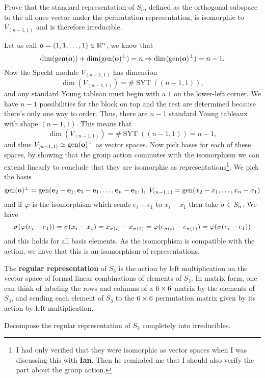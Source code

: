 \documentclass[12pt]{memoir}
\DeclareMathOperator{\SYT}{SYT}
\begin{document}
\begin{Ej}[Exercise 4]
    Prove that the standard representation of $S_n$, defined as the orthogonal subspace to the all
ones vector under the permutation representation, is isomorphic to $V_{(n-1,1)}$ and is therefore irreducible.
\end{Ej}

\begin{ptcbr}
    Let us call $\mathbf{o}=(1,1,\dots,1)\in\mathbb{R}^n$, we know that 
    $$\dim(\operatorname{gen}(\mathbf{o}))+\dim(\operatorname{gen}(\mathbf{o})^\perp)=n\Rightarrow \dim(\operatorname{gen}(\mathbf{o})^\perp)=n-1.$$
    Now the Specht module $V_{(n-1,1)}$ has dimension 
    $$\dim(V_{(n-1,1)})=\#\SYT((n-1,1)),$$
    and any standard Young tableau must begin with a $1$ on the lower-left corner. We have $n-1$ possibilities for the block on top and the rest are determined because there's only one way to order. Thus, there are $n-1$ standard Young tableaux with shape $(n-1,1)$. This means that
    $$\dim(V_{(n-1,1)})=\#\SYT((n-1,1))=n-1,$$
    and thus $V_{(n-1,1)}\simeq \operatorname{gen}(\mathbf{o})^\perp$ as vector spaces. Now pick bases for each of these spaces, by showing that the group action commutes with the isomorphism we can extend linearly to conclude that they are isomorphic as representations\footnote{I had only verified that they were isomorphic as vector spaces when I was discussing this with \textbf{Ian}. Then he reminded me that I should also verify the part about the group action.}. We pick the basis 
    $$\gen(\vec{o})^\perp=\gen(\vec e_2-\vec e_1,\vec e_3-\vec e_1,\dots,\vec e_n-\vec e_1,),\ V_{(n-1,1)}=\gen(x_2-x_1,\dots,x_n-x_1)$$
    and if $\varphi$ is the isomorphism which sends $e_i-e_1$ to $x_i-x_1$ then take $\sigma\in S_n$. We have 
    $$\sigma(\varphi(e_i-e_1))=\sigma(x_i-x_1)=x_{\sigma(i)}-x_{\sigma(1)}=\varphi(e_{\sigma(i)}-e_{\sigma(1)})=\varphi(\sigma(e_i-e_1))$$
    and this holds for all basis elements. As the isomorphism is compatible with the action, we have that this is an isomorphism of representations.
\end{ptcbr}
\newpage
\begin{Ej}[Exercise 5]
    The \textbf{regular representation} of $S_3$ is the action by left multiplication on the vector space of formal linear combinations of elements of $S_3$. In matrix form, one can think of labeling the
rows and columns of a $6\times 6$ matrix by the elements of $S_3$, and sending each element of $S_3$ to the $6\times 6$
permutation matrix given by its action by left multiplication.\par
Decompose the regular representation of $S_3$ completely into irreducibles.
\end{Ej}
\end{document}
